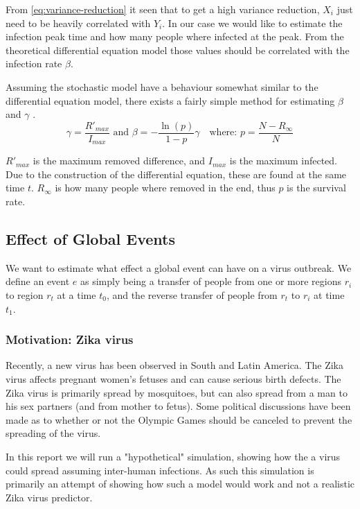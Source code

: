 From \eqref{eq:variance-reduction} it seen that to get a high variance reduction, $X_i$ just need to be heavily correlated with $Y_i$. In our case we would like to estimate the infection peak time and how many people where infected at the peak. From the theoretical differential equation model those values should be correlated with the infection rate $\beta$.

Assuming the stochastic model have a behaviour somewhat similar to the differential equation model, there exists a fairly simple method for estimating $\beta$ and $\gamma$ \cite{wiki-sir}.
\begin{equation}
\gamma = \frac{R'_{max}}{I_{max}} \text{ and } \beta = -\frac{\ln(p)}{1 - p} \gamma \quad \text{where: } p = \frac{N - R_\infty}{N} 
\end{equation}

$R'_{max}$ is the maximum removed difference, and $I_{max}$ is the maximum infected. Due to the construction of the differential equation, these are found at the same time $t$. $R_\infty$ is how many people where removed in the end, thus $p$ is the survival rate.

\subsection{Effect of Global Events}
We want to estimate what effect a global event can have on a virus outbreak. We define an event $e$ as simply being a transfer of people from one or more regions $r_{i}$ to region $r_t$ at a time $t_0$, and the reverse transfer of people from $r_t$ to $r_{i}$ at time $t_1$.

\subsubsection{Motivation: Zika virus}
Recently, a new virus has been observed in South and Latin America. The Zika virus affects pregnant women's fetuses and can cause serious birth defects. The Zika virus is primarily spread by mosquitoes, but can also spread from a man to his sex partners (and from mother to fetus). Some political discussions have been made as to whether or not the Olympic Games should be canceled to prevent the spreading of the virus.

In this report we will run a "hypothetical" simulation, showing how the a virus could spread assuming inter-human infections. As such this simulation is primarily an attempt of showing how such a model would work and not a realistic Zika virus predictor.

